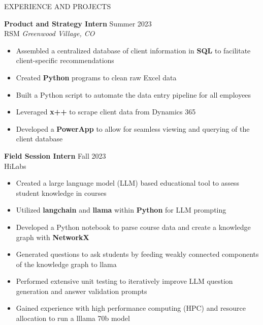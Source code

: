 \documentclass{resume} %
\begin{document}
\begin{rSection}{EXPERIENCE AND PROJECTS}

\textbf{Product and Strategy Intern} \hfill Summer 2023\\
RSM \hfill \textit{Greenwood Village, CO}
\vspace{-6pt}
 \begin{itemize}
    \itemsep -6pt {} 
     \item Assembled a centralized database of client information in \textbf{SQL} to facilitate client-specific recommendations 
     \item Created \textbf{Python} programs to clean raw Excel data
     \item Built a Python script to automate the data entry pipeline for all employees
     \item Leveraged \textbf{x++} to scrape client data from Dynamics 365
     \item Developed a \textbf{PowerApp} to allow for seamless viewing and querying of the client database
 \end{itemize}
 

\textbf{Field Session Intern} \hfill Fall 2023\\
HiLabs \hfill
\vspace{-6pt}
 \begin{itemize}
    \itemsep -6pt {} 
    \item Created a large language model (LLM) based educational tool to assess student knowledge in courses
    \item Utilized \textbf{langchain} and \textbf{llama} within \textbf{Python} for LLM prompting
    \item Developed a Python notebook to parse course data and create a knowledge graph with \textbf{NetworkX}
    \item Generated questions to ask students by feeding weakly connected components of the knowledge graph to llama
    \item Performed extensive unit testing to iteratively improve LLM question generation and answer validation prompts
    \item Gained experience with high performance computing (HPC) and resource allocation to run a lllama 70b model
 \end{itemize}
 

%
%


\end{rSection}
\end{document}
